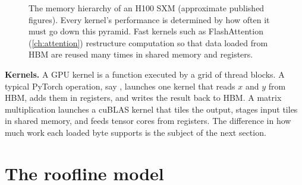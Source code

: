 \begin{figure}[t]
\centering
{}
\caption{The memory hierarchy of an H100 SXM (approximate published figures). Every kernel's performance is
determined by how often it must go down this pyramid. Fast kernels such as FlashAttention
(\cref{ch:attention}) restructure computation so that data loaded from HBM are reused many times in
shared memory and registers.}
\label{fig:pytorch:hierarchy}
\end{figure}

\textbf{Kernels.} A GPU kernel is a function executed by a grid of thread blocks. A typical PyTorch
operation, say , launches one kernel that reads $x$ and $y$ from HBM, adds them in
registers, and writes the result back to HBM. A matrix multiplication launches a cuBLAS kernel that tiles the
output, stages input tiles in shared memory, and feeds tensor cores from registers. The difference in how much
work each loaded byte supports is the subject of the next section.

\section{The roofline model}\label{sec:pytorch:roofline}

